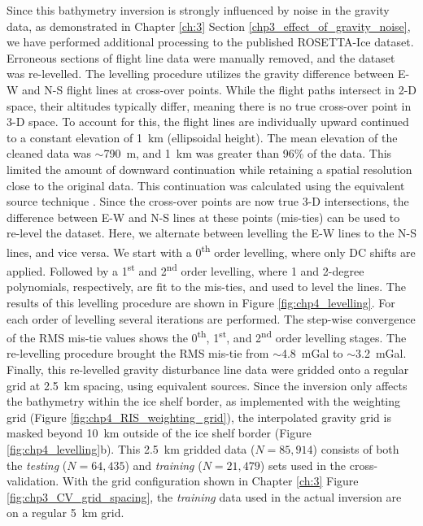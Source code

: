 Since this bathymetry inversion is strongly influenced by noise in the gravity data, as demonstrated in Chapter \ref{ch:3} Section \ref{chp3_effect_of_gravity_noise}, we have performed additional processing to the published ROSETTA-Ice dataset. Erroneous sections of flight line data were manually removed, and the dataset was re-levelled. The levelling procedure utilizes the gravity difference between E-W and N-S flight lines at cross-over points. While the flight paths intersect in 2-D space, their altitudes typically differ, meaning there is no true cross-over point in 3-D space. To account for this, the flight lines are individually upward continued to a constant elevation of 1~km (ellipsoidal height). The mean elevation of the cleaned data was $\sim$790~m, and 1~km was greater than 96\% of the data. This limited the amount of downward continuation while retaining a spatial resolution close to the original data. This continuation was calculated using the equivalent source technique \citep[see Section \ref{chp3:eq source resampled}][]{dampneyequivalent1969, solergradientboosted2021}. Since the cross-over points are now true 3-D intersections, the difference between E-W and N-S lines at these points (mis-ties) can be used to re-level the dataset. Here, we alternate between levelling the E-W lines to the N-S lines, and vice versa. We start with a 0\textsuperscript{th} order levelling, where only DC shifts are applied. Followed by a 1\textsuperscript{st} and 2\textsuperscript{nd} order levelling, where 1 and 2-degree polynomials, respectively, are fit to the mis-ties, and used to level the lines. The results of this levelling procedure are shown in Figure \ref{fig:chp4_levelling}. For each order of levelling several iterations are performed. The step-wise convergence of the RMS mis-tie values shows the 0\textsuperscript{th}, 1\textsuperscript{st}, and 2\textsuperscript{nd} order levelling stages. The re-levelling procedure brought the RMS mis-tie from $\sim$4.8~mGal to $\sim$3.2~mGal. \\

Finally, this re-levelled gravity disturbance line data were gridded onto a regular grid at 2.5~km spacing, using equivalent sources. Since the inversion only affects the bathymetry within the ice shelf border, as implemented with the weighting grid (Figure \ref{fig:chp4_RIS_weighting_grid}), the interpolated gravity grid is masked beyond 10~km outside of the ice shelf border (Figure \ref{fig:chp4_levelling}b). This 2.5~km gridded data ($N=85,914$) consists of both the \textit{testing} ($N=64,435$) and \textit{training} ($N=21,479$) sets used in the cross-validation. With the grid configuration shown in Chapter \ref{ch:3} Figure \ref{fig:chp3_CV_grid_spacing}, the \textit{training} data used in the actual inversion are on a regular 5~km grid. \\

